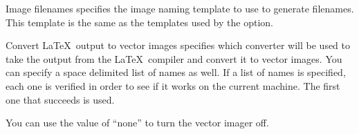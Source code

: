 \begin{configuration}{Image filenames}
specifies the image naming template to use to generate filenames.  This
template is the same as the templates used by the 
option.
\end{configuration}

\begin{configuration}{Convert \LaTeX\ output to vector images}
specifies which converter will be used to take the output from the
\LaTeX\ compiler and convert it to vector images.  You can specify a space 
delimited list of names as well.  If a list of names is specified, 
each one is verified in order to see if it works on the current machine.
The first one that succeeds is used.

You can use the value of ``none'' to turn the vector imager off.

\end{configuration}
